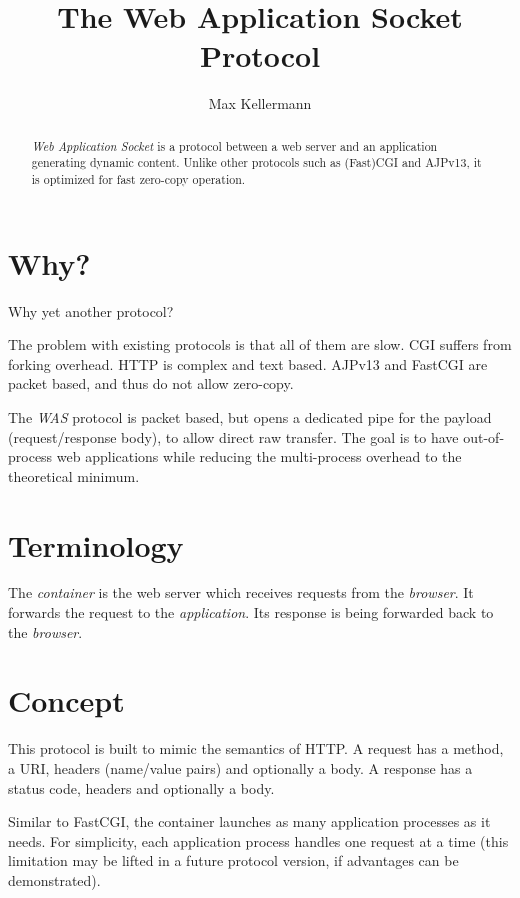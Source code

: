 \documentclass[a4paper,12pt]{article}
\begin{document}
\title{The Web Application Socket Protocol}
\author{Max Kellermann}

\maketitle

\begin{abstract}
\emph{Web Application Socket} is a protocol between a web server and
an application generating dynamic content.  Unlike other protocols
such as (Fast)CGI and AJPv13, it is optimized for fast zero-copy
operation.
\end{abstract}

\setcounter{tocdepth}{2}
\tableofcontents
\newpage

\section{Why?}

Why yet another protocol?

The problem with existing protocols is that all of them are slow.  CGI
suffers from forking overhead.  HTTP is complex and text based.
AJPv13 and FastCGI are packet based, and thus do not allow zero-copy.

The \emph{WAS} protocol is packet based, but opens a dedicated pipe
for the payload (request/response body), to allow direct raw transfer.
The goal is to have out-of-process web applications while reducing the
multi-process overhead to the theoretical minimum.

\section{Terminology}

The \emph{container} is the web server which receives requests from
the \emph{browser}.  It forwards the request to the
\emph{application}.  Its response is being forwarded back to the
\emph{browser}.

\section{Concept}

This protocol is built to mimic the semantics of HTTP.  A request has
a method, a URI, headers (name/value pairs) and optionally a body.  A
response has a status code, headers and optionally a body.

Similar to FastCGI, the container launches as many application
processes as it needs.  For simplicity, each application process
handles one request at a time (this limitation may be lifted in a
future protocol version, if advantages can be demonstrated).
\end{document}
